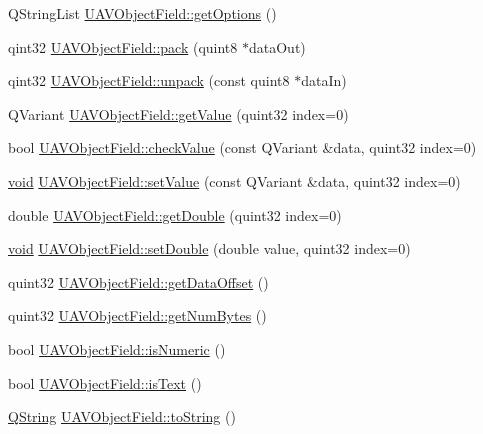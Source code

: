 \begin{DoxyCompactItemize}
\-Q\-String\-List \hyperlink{group___u_a_v_objects_plugin_ga23e324a921bdf20972f940b4497a2c21}{\-U\-A\-V\-Object\-Field\-::get\-Options} ()
\item 
qint32 \hyperlink{group___u_a_v_objects_plugin_gabfadd471718e9a6bdb5e106fb99574d9}{\-U\-A\-V\-Object\-Field\-::pack} (quint8 $\ast$data\-Out)
\item 
qint32 \hyperlink{group___u_a_v_objects_plugin_ga8223d7b605648a98c12d00ae43febd5c}{\-U\-A\-V\-Object\-Field\-::unpack} (const quint8 $\ast$data\-In)
\item 
\-Q\-Variant \hyperlink{group___u_a_v_objects_plugin_ga60a1c56703ea2c28f76d1eaf05554f5e}{\-U\-A\-V\-Object\-Field\-::get\-Value} (quint32 index=0)
\item 
bool \hyperlink{group___u_a_v_objects_plugin_ga8aed4e68eb0697d4776a103bfe5aa059}{\-U\-A\-V\-Object\-Field\-::check\-Value} (const \-Q\-Variant \&data, quint32 index=0)
\item 
\hyperlink{group___u_a_v_objects_plugin_ga444cf2ff3f0ecbe028adce838d373f5c}{void} \hyperlink{group___u_a_v_objects_plugin_gab647538e1956252e12841c42a54106c7}{\-U\-A\-V\-Object\-Field\-::set\-Value} (const \-Q\-Variant \&data, quint32 index=0)
\item 
double \hyperlink{group___u_a_v_objects_plugin_gac189fe8172d3c25a937b7d0106025dfe}{\-U\-A\-V\-Object\-Field\-::get\-Double} (quint32 index=0)
\item 
\hyperlink{group___u_a_v_objects_plugin_ga444cf2ff3f0ecbe028adce838d373f5c}{void} \hyperlink{group___u_a_v_objects_plugin_ga6c5e6a55d16226d0cfef0d2f512e243e}{\-U\-A\-V\-Object\-Field\-::set\-Double} (double value, quint32 index=0)
\item 
quint32 \hyperlink{group___u_a_v_objects_plugin_gaacffb4e86c637986046b656bb1e8219a}{\-U\-A\-V\-Object\-Field\-::get\-Data\-Offset} ()
\item 
quint32 \hyperlink{group___u_a_v_objects_plugin_ga872f22445800243679ca0860c3b8b7f1}{\-U\-A\-V\-Object\-Field\-::get\-Num\-Bytes} ()
\item 
bool \hyperlink{group___u_a_v_objects_plugin_ga5e1a07c1bc278bd1d8f1460ca08d13c7}{\-U\-A\-V\-Object\-Field\-::is\-Numeric} ()
\item 
bool \hyperlink{group___u_a_v_objects_plugin_ga6ad4eb36bd160d16bccdc494caf60938}{\-U\-A\-V\-Object\-Field\-::is\-Text} ()
\item 
\hyperlink{group___u_a_v_objects_plugin_gab9d252f49c333c94a72f97ce3105a32d}{\-Q\-String} \hyperlink{group___u_a_v_objects_plugin_ga149341e646b59250818f980dce9fd601}{\-U\-A\-V\-Object\-Field\-::to\-String} ()

\end{DoxyCompactItemize}
